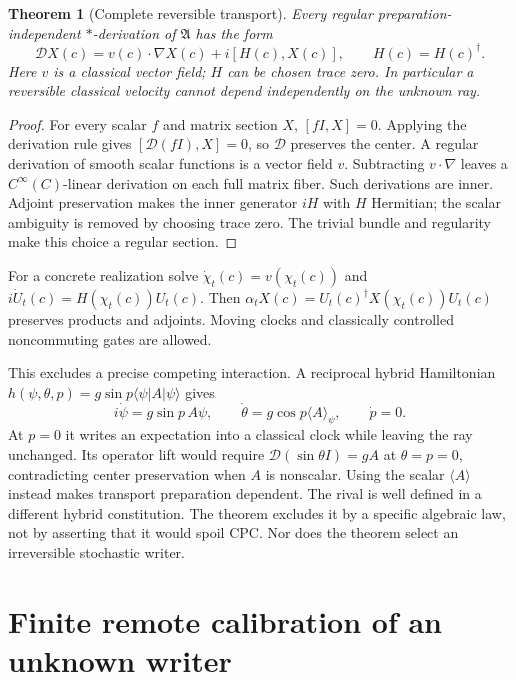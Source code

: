 \documentclass[11pt,oneside,openany]{book}
\newtheorem{theorem}{Theorem}[chapter]
\theoremstyle{definition}
\theoremstyle{remark}\newtheorem{remark}[theorem]{Remark}
\begin{document}
\begin{theorem}[Complete reversible transport]
\label{cpc:thm:algebra}
Every regular preparation-independent $*$-derivation of $\mathfrak A$ has the form
\begin{equation}
 \mathcal D X(c)=v(c)\cdot\nabla X(c)+i[H(c),X(c)],\qquad H(c)=H(c)^\dagger.
 \label{cpc:eq:derivation}
\end{equation}
Here $v$ is a classical vector field; $H$ can be chosen trace zero. In particular a reversible classical velocity cannot depend independently on the unknown ray.
\end{theorem}
\begin{proof}
For every scalar $f$ and matrix section $X$, $[fI,X]=0$. Applying the derivation rule gives $[\mathcal D(fI),X]=0$, so $\mathcal D$ preserves the center. A regular derivation of smooth scalar functions is a vector field $v$. Subtracting $v\cdot\nabla$ leaves a $C^\infty(C)$-linear derivation on each full matrix fiber. Such derivations are inner. Adjoint preservation makes the inner generator $iH$ with $H$ Hermitian; the scalar ambiguity is removed by choosing trace zero. The trivial bundle and regularity make this choice a regular section.
\end{proof}

For a concrete realization solve $\dot\chi_t(c)=v(\chi_t(c))$ and $i\dot U_t(c)=H(\chi_t(c))U_t(c)$. Then
$\alpha_tX(c)=U_t(c)^\dagger X(\chi_t(c))U_t(c)$
preserves products and adjoints. Moving clocks and classically controlled noncommuting gates are allowed.

This excludes a precise competing interaction. A reciprocal hybrid Hamiltonian
$h(\psi,\theta,p)=g\sin p\langle\psi|A|\psi\rangle$
gives
\begin{equation}
 i\dot\psi=g\sin p\,A\psi,\qquad
 \dot\theta=g\cos p\langle A\rangle_\psi,\qquad \dot p=0.
 \label{cpc:eq:hybrid}
\end{equation}
At $p=0$ it writes an expectation into a classical clock while leaving the ray unchanged. Its operator lift would require $\mathcal D(\sin\theta I)=gA$ at $\theta=p=0$, contradicting center preservation when $A$ is nonscalar. Using the scalar $\langle A\rangle$ instead makes transport preparation dependent. The rival is well defined in a different hybrid constitution. The theorem excludes it by a specific algebraic law, not by asserting that it would spoil CPC. Nor does the theorem select an irreversible stochastic writer.

\section{Finite remote calibration of an unknown writer}
\end{document}
